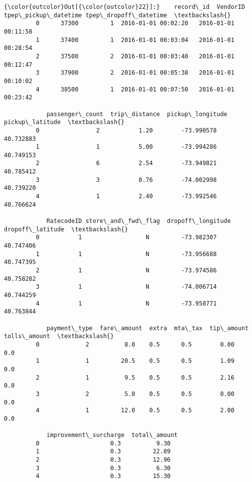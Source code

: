 \documentclass[11pt]{article}
\begin{document}
\begin{Verbatim}[commandchars=\\\{\}]
{\color{outcolor}Out[{\color{outcolor}22}]:}    record\_id  VendorID tpep\_pickup\_datetime tpep\_dropoff\_datetime  \textbackslash{}
         0      37300         1  2016-01-01 00:02:20   2016-01-01 00:11:58   
         1      37400         1  2016-01-01 00:03:04   2016-01-01 00:28:54   
         2      37500         2  2016-01-01 00:03:40   2016-01-01 00:12:47   
         3      37900         2  2016-01-01 00:05:38   2016-01-01 00:10:02   
         4      38500         1  2016-01-01 00:07:50   2016-01-01 00:23:42   
         
            passenger\_count  trip\_distance  pickup\_longitude  pickup\_latitude  \textbackslash{}
         0                2           1.20        -73.990578        40.732883   
         1                1           5.00        -73.994286        40.749153   
         2                6           2.54        -73.949821        40.785412   
         3                3           0.76        -74.002998        40.739220   
         4                1           2.40        -73.992546        40.766624   
         
            RatecodeID store\_and\_fwd\_flag  dropoff\_longitude  dropoff\_latitude  \textbackslash{}
         0           1                  N         -73.982307         40.747406   
         1           1                  N         -73.956688         40.747395   
         2           1                  N         -73.974586         40.758282   
         3           1                  N         -74.006714         40.744259   
         4           1                  N         -73.958771         40.763844   
         
            payment\_type  fare\_amount  extra  mta\_tax  tip\_amount  tolls\_amount  \textbackslash{}
         0             2          8.0    0.5      0.5        0.00           0.0   
         1             1         20.5    0.5      0.5        1.09           0.0   
         2             1          9.5    0.5      0.5        2.16           0.0   
         3             2          5.0    0.5      0.5        0.00           0.0   
         4             1         12.0    0.5      0.5        2.00           0.0   
         
            improvement\_surcharge  total\_amount  
         0                    0.3          9.30  
         1                    0.3         22.89  
         2                    0.3         12.96  
         3                    0.3          6.30  
         4                    0.3         15.30  
\end{Verbatim}
            
\end{document}
